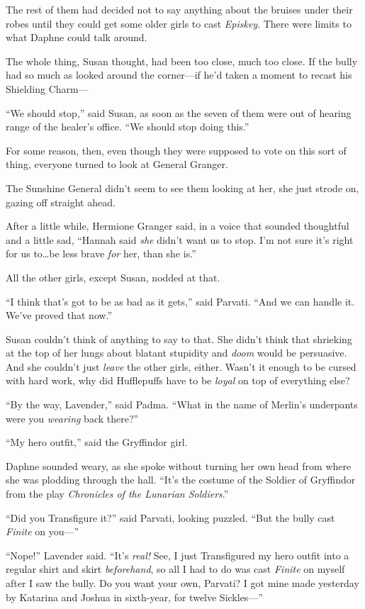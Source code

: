 The rest of them had decided not to say anything about the bruises under their robes until they could get some older girls to cast \emph{Episkey}. There were limits to what Daphne could talk around.

The whole thing, Susan thought, had been too close, much too close. If the bully had so much as looked around the corner—if he’d taken a moment to recast his Shielding Charm—

“We should stop,” said Susan, as soon as the seven of them were out of hearing range of the healer’s office. “We should stop doing this.”

For some reason, then, even though they were supposed to vote on this sort of thing, everyone turned to look at General Granger.

The Sunshine General didn’t seem to see them looking at her, she just strode on, gazing off straight ahead.

After a little while, Hermione Granger said, in a voice that sounded thoughtful and a little sad, “Hannah said \emph{she} didn’t want us to stop. I’m not sure it’s right for us to…be less brave \emph{for} her, than she is.”

All the other girls, except Susan, nodded at that.

“I think that’s got to be as bad as it gets,” said Parvati. “And we can handle it. We’ve proved that now.”

Susan couldn’t think of anything to say to that. She didn’t think that shrieking at the top of her lungs about blatant stupidity and \emph{doom} would be persuasive. And she couldn’t just \emph{leave} the other girls, either. Wasn’t it enough to be cursed with hard work, why did Hufflepuffs have to be \emph{loyal} on top of everything else?

“By the way, Lavender,” said Padma. “What in the name of Merlin’s underpants were you \emph{wearing} back there?”

“My hero outfit,” said the Gryffindor girl.

Daphne sounded weary, as she spoke without turning her own head from where she was plodding through the hall. “It’s the costume of the Soldier of Gryffindor from the play \emph{Chronicles of the Lunarian Soldiers}.”

“Did you Transfigure it?” said Parvati, looking puzzled. “But the bully cast \emph{Finite} on you—”

“Nope!” Lavender said. “It’s \emph{real!} See, I just Transfigured my hero outfit into a regular shirt and skirt \emph{beforehand}, so all I had to do was cast \emph{Finite} on myself after I saw the bully. Do you want your own, Parvati? I got mine made yesterday by Katarina and Joshua in sixth-year, for twelve Sickles—”


